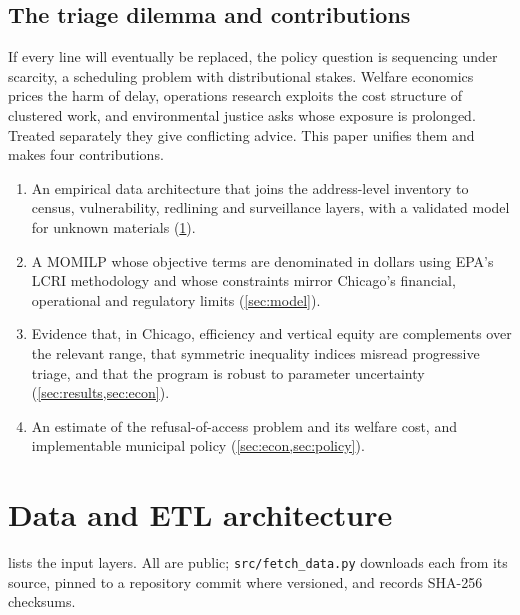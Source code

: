 \documentclass[11pt]{article}
\begin{document}
\subsection{The triage dilemma and contributions}
If every line will eventually be replaced, the policy question is sequencing under scarcity, a
scheduling problem with distributional stakes. Welfare economics prices the harm of delay,
operations research exploits the cost structure of clustered work, and environmental justice asks
whose exposure is prolonged. Treated separately they give conflicting advice. This paper unifies
them and makes four contributions.
\begin{enumerate}[nosep]
\item An empirical data architecture that joins the address-level inventory to census,
vulnerability, redlining and surveillance layers, with a validated model for unknown materials
(\cref{sec:data}).
\item A MOMILP whose objective terms are denominated in dollars using EPA's LCRI methodology and
whose constraints mirror Chicago's financial, operational and regulatory limits (\cref{sec:model}).
\item Evidence that, in Chicago, efficiency and vertical equity are complements over the relevant
range, that symmetric inequality indices misread progressive triage, and that the program is
robust to parameter uncertainty (\cref{sec:results,sec:econ}).
\item An estimate of the refusal-of-access problem and its welfare cost, and implementable
municipal policy (\cref{sec:econ,sec:policy}).
\end{enumerate}

\section{Data and ETL architecture}\label{sec:data}
 lists the input layers. All are public; \texttt{src/fetch\_data.py} downloads each
from its source, pinned to a repository commit where versioned, and records SHA-256 checksums.
\end{document}
